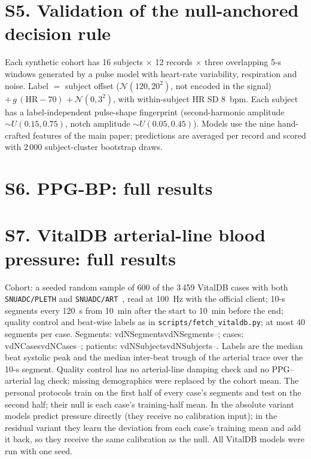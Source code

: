 \documentclass[journal,onecolumn]{IEEEtran}
\newcommand{\m}[1]{\ifcsname #1\endcsname\csname #1\endcsname\else\textcolor{red}{--}\fi}
\begin{document}
\suppDetectorTable

\section*{S5. Validation of the null-anchored decision rule}
Each synthetic cohort has 16 subjects $\times$ 12 records $\times$ three
overlapping 5-s windows generated by a pulse model with heart-rate
variability, respiration and noise.  Label $=$ subject offset
($\mathcal{N}(120, 20^2)$, not encoded in the signal) $+\,g\,(\mathrm{HR}-70)$
$+\,\mathcal{N}(0, 3^2)$, with within-subject HR SD 8~bpm.  Each subject has
a label-independent pulse-shape fingerprint (second-harmonic amplitude
$\sim U(0.15, 0.75)$, notch amplitude $\sim U(0.05, 0.45)$).  Models use the
nine hand-crafted features of the main paper; predictions are averaged per
record and scored with 2\,000 subject-cluster bootstrap draws.

\suppRuleTable

\section*{S6. PPG-BP: full results}
\suppPpgbpTable

\section*{S7. VitalDB arterial-line blood pressure: full results}
Cohort: a seeded random sample of 600 of the 3\,459 VitalDB cases with both \texttt{SNUADC/PLETH} and
\texttt{SNUADC/ART}~\cite{lee2022vitaldb}, read at 100~Hz with the official client; 10-s segments every 120~s
from 10~min after the start to 10~min before the end; quality control and beat-wise labels as in
\texttt{scripts/fetch\_vitaldb.py}; at most 40 segments per case.  Segments: \m{vdNSegments}; cases:
\m{vdNCases}; patients: \m{vdNSubjects}.  Labels are the median beat systolic peak and the median inter-beat trough
of the arterial trace over the 10-s segment.  Quality control has no arterial-line damping check and no PPG--arterial
lag check; missing demographics were replaced by the cohort mean.  The personal protocols train on the first half of
every case's segments and test on the second half; their null is each case's training-half mean.  In the absolute
variant models predict pressure directly (they receive no calibration input); in the residual variant they learn the
deviation from each case's training mean and add it back, so they receive the same calibration as the null.  All
VitalDB models were run with one seed.
\end{document}
